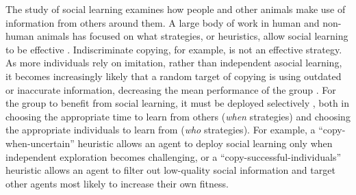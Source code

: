 \documentclass[12pt,letterpaper]{article}
\begin{document}

The study of social learning examines how people and other animals make use of information from others around them.
A large body of work in human and non-human animals has focused on what strategies, or heuristics, allow social learning to be effective \cite{laland_social_2004,hoppitt2013social,RendellFogarty___Laland11_CognitiveCulture}. 
Indiscriminate copying, for example, is not an effective strategy. 
As more individuals rely on imitation, rather than independent asocial learning, it becomes increasingly likely that a random target of copying is using outdated or inaccurate information, decreasing the mean performance of the group \cite{rogers_does_1988}.
For the group to benefit from social learning, it must be deployed selectively \cite{kameda2003does,boyd1995does,kendal2005trade}, both in choosing the appropriate time to learn from others (\emph{when} strategies) and choosing the appropriate individuals to learn from (\emph{who} strategies). 
For example, a ``copy-when-uncertain'' heuristic allows an agent to deploy social learning only when independent exploration becomes challenging, or a ``copy-successful-individuals'' heuristic allows an agent to filter out low-quality social information and target other agents most likely to increase their own fitness.
\end{document}
